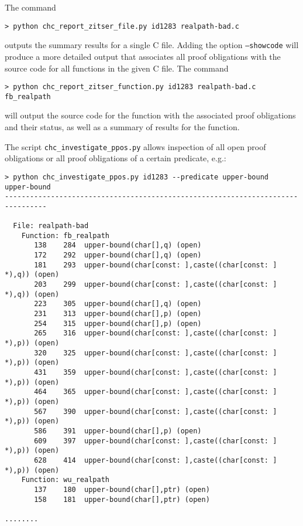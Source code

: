 \documentclass[11pt]{article}
\begin{document}
The command
\begin{verbatim}
> python chc_report_zitser_file.py id1283 realpath-bad.c
\end{verbatim}
outputs the summary results for a single C file. Adding the option {\tt --showcode}
will produce a more detailed output that associates all proof obligations with the
source code for all functions in the given C file. The command
\begin{verbatim}
> python chc_report_zitser_function.py id1283 realpath-bad.c fb_realpath
\end{verbatim}
will output the source code for the function with the associated proof obligations
and their status, as well as a summary of results for the function.

The script {\tt chc\_investigate\_ppos.py} allows inspection of all open proof obligations
or all proof obligations of a certain predicate, e.g.:

\begin{scriptsize}
\begin{verbatim}
> python chc_investigate_ppos.py id1283 --predicate upper-bound
upper-bound
--------------------------------------------------------------------------------

  File: realpath-bad
    Function: fb_realpath
       138    284  upper-bound(char[],q) (open)
       172    292  upper-bound(char[],q) (open)
       181    293  upper-bound(char[const: ],caste((char[const: ] *),q)) (open)
       203    299  upper-bound(char[const: ],caste((char[const: ] *),q)) (open)
       223    305  upper-bound(char[],q) (open)
       231    313  upper-bound(char[],p) (open)
       254    315  upper-bound(char[],p) (open)
       265    316  upper-bound(char[const: ],caste((char[const: ] *),p)) (open)
       320    325  upper-bound(char[const: ],caste((char[const: ] *),p)) (open)
       431    359  upper-bound(char[const: ],caste((char[const: ] *),p)) (open)
       464    365  upper-bound(char[const: ],caste((char[const: ] *),p)) (open)
       567    390  upper-bound(char[const: ],caste((char[const: ] *),p)) (open)
       586    391  upper-bound(char[],p) (open)
       609    397  upper-bound(char[const: ],caste((char[const: ] *),p)) (open)
       628    414  upper-bound(char[const: ],caste((char[const: ] *),p)) (open)
    Function: wu_realpath
       137    180  upper-bound(char[],ptr) (open)
       158    181  upper-bound(char[],ptr) (open)

........
\end{verbatim}
\end{scriptsize}
\end{document}
